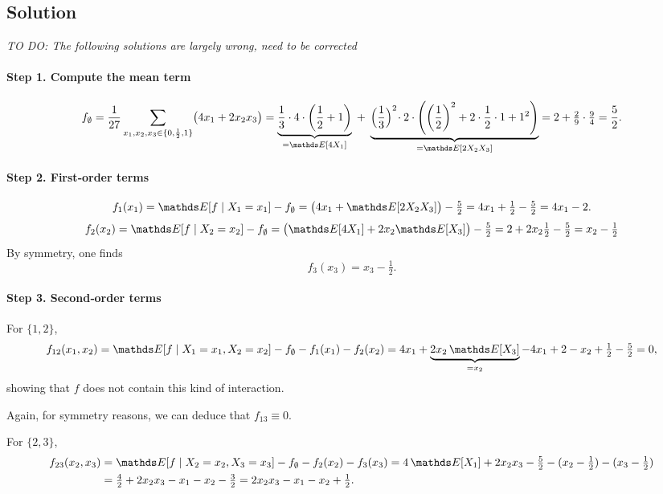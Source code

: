 \documentclass[a4paper]{article}
\begin{document}
\subsection*{Solution}

\textit{TO DO: The following solutions are largely wrong, need to be corrected}

\paragraph{Step 1. Compute the mean term}
\[
f_\emptyset
=\frac{1}{27}\sum_{x_1,x_2,x_3\in\{0,\frac12,1\}}
   \bigl(4x_1 + 2x_2x_3\bigr)
= \underbrace{\frac{1}{3}\cdot4\cdot \left( \frac{1}{2} + 1 \right) }_{=\E[4X_1]} \;+\;
  \underbrace{\Bigl(\frac{1}{3}\Bigr)^{2}\! \cdot 2 \cdot \left( \left( \frac{1}{2} \right)^2 + 2 \cdot \frac12 \cdot 1 + 1^2 \right)}_{=\E[2X_2X_3]}
= 2 + \tfrac{2}{9} \cdot \tfrac94 = \frac{5}{2}.
\]

\paragraph{Step 2. First‐order terms}
\[
f_1(x_1)
=\E[f\mid X_1=x_1] - f_\emptyset
= \bigl(4x_1 + \E[2X_2X_3]\bigr) - \tfrac{5}{2}
=4x_1 + \tfrac{1}{2} - \tfrac{5}{2}
=4x_1 - 2.
\]
\[
f_2(x_2)
=\E[f\mid X_2=x_2] - f_\emptyset
= \bigl(\E[4X_1] + 2 x_2 \E[X_3]\bigr) - \tfrac{5}{2}
= 2 + 2 x_2 \tfrac{1}{2} - \tfrac{5}{2}
= x_2 - \tfrac{1}{2}
\]
By symmetry, one finds
\[
f_3(x_3) = x_3 - \tfrac{1}{2}.
\]

\paragraph{Step 3. Second‐order terms}
For $\{1,2\}$,
\begin{align*}
    f_{12}(x_1,x_2)
    = \E[f\mid X_1=x_1,X_2=x_2]
    - f_\emptyset - f_1(x_1) - f_2(x_2)
    = 4x_1 + \underbrace{2 x_2 \, \E[X_3]}_{=x_2} - 4x_1 + 2 - x_2 + \tfrac{1}{2} - \tfrac{5}{2} 
    = 0,
\end{align*}
showing that $f$ does not contain this kind of interaction.

Again, for symmetry reasons, we can deduce that $f_{13} \equiv 0$.

For $\{2,3\}$,
\[
\begin{split}
    f_{23}(x_2,x_3)
    &= \E[f\mid X_2=x_2,X_3=x_3]
    - f_\emptyset - f_2(x_2) - f_3(x_3)
    = 4\,\E[X_1] +2 x_2 x_3 - \tfrac{5}{2} - (x_2 - \tfrac12) - (x_3 - \tfrac12) \\
    &= \tfrac{4}{2} +2 x_2 x_3 - x_1 - x_2 - \tfrac{3}{2}
    = 2 x_2 x_3 - x_1 - x_2 + \tfrac{1}{2}.        
\end{split}
\]
\end{document}
